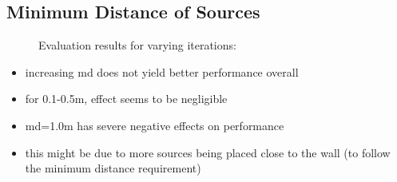 \subsection{Minimum Distance of Sources}

\begin{figure}[H]
    \setlength\figureheight{7cm}
    \small
    \setlength\figurewidth{\textwidth}
	\centering
	\begin{tikzpicture}
	    \footnotesize
	    
	    
	\end{tikzpicture}
	
	\caption[Evaluation results for varying  iterations]{Evaluation results for varying  iterations: }
	\label{fig:trial1}
\end{figure}

\begin{itemize}
    \item increasing md does not yield better performance overall
    \item for 0.1-0.5m, effect seems to be negligible
    \item md=1.0m has severe negative effects on performance
    \item this might be due to more sources being placed close to the wall (to follow the minimum distance requirement)
\end{itemize}